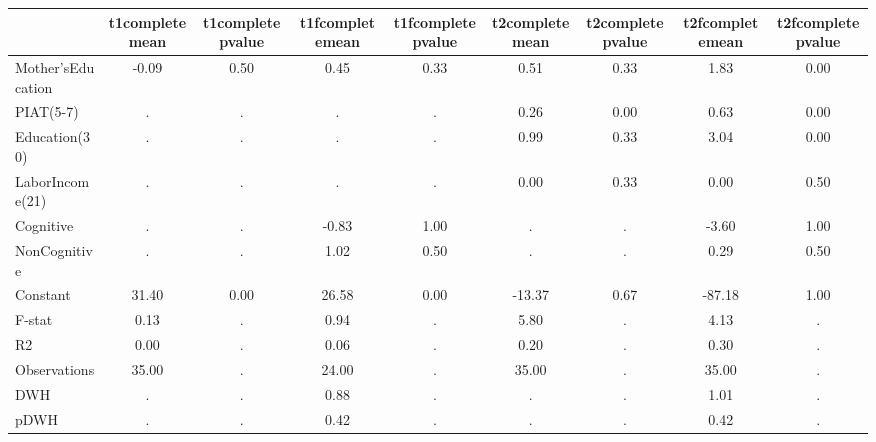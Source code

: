 \begin{table}[htbp]
\begin{tabular}{lcccccccc} \hline \hline
 & t1completemean  & t1completepvalue  & t1fcompletemean  & t1fcompletepvalue  & t2completemean  & t2completepvalue  & t2fcompletemean  & t2fcompletepvalue  \\  \hline 
Mother'sEducation &        -0.09 &         0.50 &         0.45 &         0.33 &         0.51 &         0.33 &         1.83 &         0.00 \\  
PIAT(5-7) &            . &            . &            . &            . &         0.26 &         0.00 &         0.63 &         0.00 \\  
Education(30) &            . &            . &            . &            . &         0.99 &         0.33 &         3.04 &         0.00 \\  
LaborIncome(21) &            . &            . &            . &            . &         0.00 &         0.33 &         0.00 &         0.50 \\  
Cognitive &            . &            . &        -0.83 &         1.00 &            . &            . &        -3.60 &         1.00 \\  
NonCognitive &            . &            . &         1.02 &         0.50 &            . &            . &         0.29 &         0.50 \\  
Constant &        31.40 &         0.00 &        26.58 &         0.00 &       -13.37 &         0.67 &       -87.18 &         1.00 \\  
F-stat &         0.13 &            . &         0.94 &            . &         5.80 &            . &         4.13 &            . \\  
R2 &         0.00 &            . &         0.06 &            . &         0.20 &            . &         0.30 &            . \\  
Observations &        35.00 &            . &        24.00 &            . &        35.00 &            . &        35.00 &            . \\  
DWH &            . &            . &         0.88 &            . &            . &            . &         1.01 &            . \\  
pDWH &            . &            . &         0.42 &            . &            . &            . &         0.42 &            . \\  
\hline \hline \end{tabular}
\end{table}
